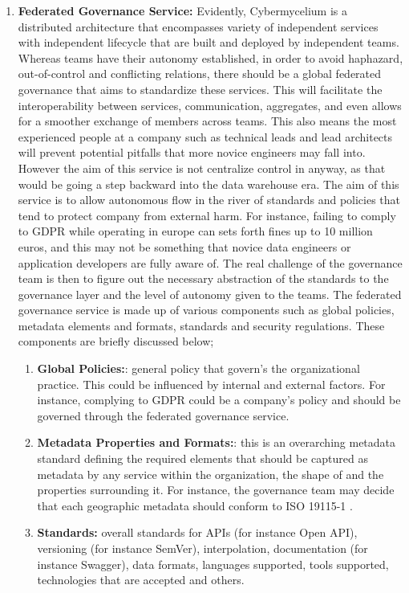 \documentclass[review]{elsarticle}
\begin{document}
\begin{enumerate}
    \item  \textbf{Federated Governance Service:} Evidently, Cybermycelium is a distributed architecture that encompasses variety of independent services with independent lifecycle that are built and deployed by independent teams. Whereas teams have their autonomy established, in order to avoid haphazard, out-of-control and conflicting relations, there should be a global federated governance that aims to standardize these services. This will facilitate the interoperability between services, communication, aggregates, and even allows for a smoother exchange of members across teams. This also means the most experienced people at a company such as technical leads and lead architects will prevent potential pitfalls that more novice engineers may fall into. However the aim of this service is not centralize control in anyway, as that would be going a step backward into the data warehouse era. The aim of this service is to allow autonomous flow in the river of standards and policies that tend to protect company from external harm. For instance, failing to comply to GDPR while operating in europe can sets forth fines up to 10 million euros, and this may not be something that novice data engineers or application developers are fully aware of. The real challenge of the governance team is then to figure out the necessary abstraction of the standards to the governance layer and the level of autonomy given to the teams. The federated governance service is made up of various components such as global policies, metadata elements and formats, standards and security regulations. These components are briefly discussed below;
    \begin{enumerate}
        \item \textbf{Global Policies:}: general policy that govern's the organizational practice. This could be influenced by internal and external factors. For instance, complying to GDPR could be a company's policy and should be governed through the federated governance service.
        \item \textbf{Metadata Properties and Formats:}: this is an overarching metadata standard defining the required elements that should be captured as metadata by any service within the organization, the shape of and the properties surrounding it. For instance, the governance team may decide that each geographic metadata should conform to ISO 19115-1 \cite{ISOMetadata}.
        \item \textbf{Standards:} overall standards for APIs (for instance Open API), versioning (for instance SemVer), interpolation, documentation (for instance Swagger), data formats, languages supported, tools supported, technologies that are accepted and others.

\end{enumerate}
\end{enumerate}
\end{document}
